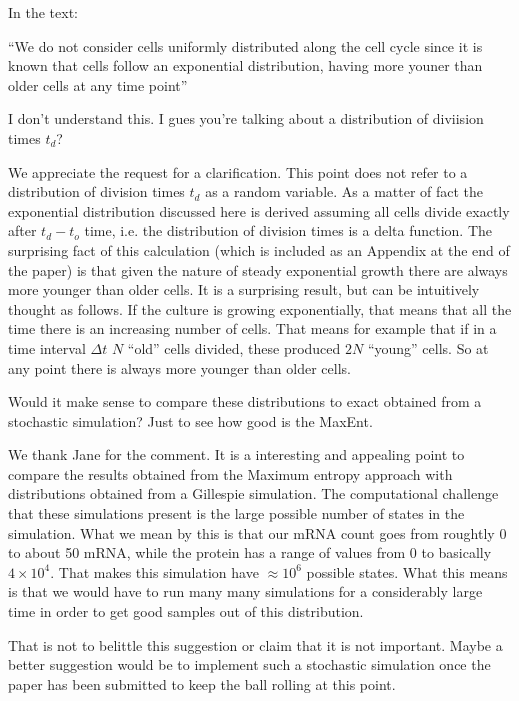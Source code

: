 \begin{tcolorbox}
In the text:

``We do not consider cells uniformly distributed along the cell cycle since it
is known that cells follow an exponential distribution, having more youner than
older cells at any time point''

I don't understand this. I gues you're talking about a distribution of diviision
times $t_d$?
\end{tcolorbox}

We appreciate the request for a clarification. This point does not refer to a
distribution of division times $t_d$ as a random variable. As a matter of fact
the exponential distribution discussed here is derived assuming all cells divide
exactly after $t_d - t_o$ time, i.e. the distribution of division times is a
delta function. The surprising fact of this calculation (which is included as
an Appendix at the end of the paper) is that given the nature of steady
exponential  growth there are always more younger than older cells. It is a
surprising result, but can be intuitively thought as follows. If the culture is
growing exponentially, that means that all the time there is an increasing
number of cells. That means for example that if in a time interval $\Delta t$
$N$ ``old'' cells divided, these produced $2N$ ``young'' cells. So at any point
there is always more younger than older cells.

\begin{tcolorbox}
Would it make sense to compare these distributions to exact obtained from a
stochastic simulation? Just to see how good is the MaxEnt.
\end{tcolorbox}

We thank Jane for the comment. It is a interesting and appealing point to
compare the results obtained from the Maximum entropy approach with
distributions obtained from a Gillespie simulation. The computational challenge
that these simulations present is the large possible number of states in the
simulation. What we mean by this is that our mRNA count goes from roughtly 0 to
about 50 mRNA, while the protein has a range of values from 0 to basically
$4 \times 10^4$. That makes this simulation have $\approx 10^6$ possible states.
What this means is that we would have to run many many simulations for a
considerably large time in order to get good samples out of this distribution.

That is not to belittle this suggestion or claim that it is not important. Maybe
a better suggestion would be to implement such a stochastic simulation once the
paper has been submitted to keep the ball rolling at this point.



